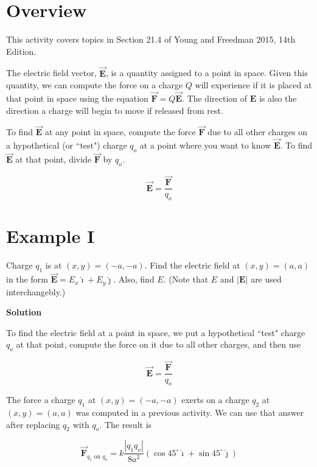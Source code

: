\documentclass{article}
\newcommand{\ihat}[0]{\hat{\boldsymbol{\imath}}}
\newcommand{\jhat}[0]{\hat{\boldsymbol{\jmath}}}
\newcommand{\bfvec}[1]{\vec{\mathbf{#1}}}
\begin{document}
\section{Overview}

This activity covers topics in Section 21.4 of Young and Freedman 2015, 14th Edition.

The electric field vector, $\bfvec{E}$, is a quantity assigned to a point in space. Given this quantity, we can compute the force on a charge $Q$ will experience if it is placed at that point in space using the equation $\bfvec{F}=Q\bfvec{E}$. The direction of $\mathbf{E}$ is also the direction a charge will begin to move if released from rest.

To find $\bfvec{E}$ at any point in space, 
compute the force $\bfvec{F}$ due to all other charges on a hypothetical (or ``test") charge $q_o$ at a point where you want to know $\bfvec{E}$. To find $\bfvec{E}$ at that point, divide $\bfvec{F}$ by $q_o$.

\begin{equation}
\bfvec{E} = \frac{\bfvec{F}}{q_o}
\end{equation}


\section{Example I}

Charge $q_1$ is at $(x,y)=(-a,-a)$. Find the electric field at $(x,y)=(a,a)$ in the form $\bfvec{E}=E_x\ihat + E_y\jhat$. Also, find $E$. (Note that $E$ and $|\mathbf{E}|$ are used interchangebly.)

\textbf{Solution}

To find the electric field at a point in space, we put a hypothetical ``test" charge $q_o$ at that point, compute the force on it due to all other charges, and then use

\begin{equation}
\bfvec{E} = \frac{\bfvec{F}}{q_o}
\end{equation}

The force a charge $q_1$ at $(x,y)=(-a,-a)$ exerts on a charge $q_2$ at $(x,y)=(a,a)$ was computed in a previous activity. We can use that answer after replacing $q_2$ with $q_o$. The result is

\begin{equation}
\bfvec{F}_{q_1\text{ on } q_o}=k\frac{|q_1q_o|}{8a^2}(\cos 45^\circ \ihat + \sin 45^\circ \jhat)
\end{equation}
\end{document}
